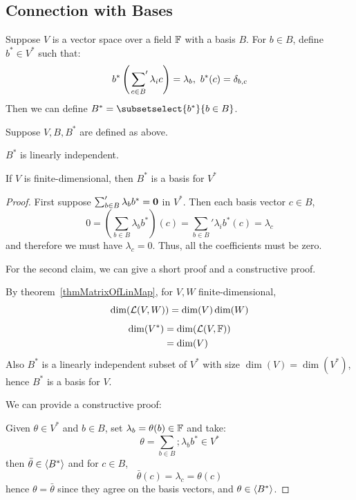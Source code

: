 \documentclass[../Main.tex]{subfiles}
\begin{document}
\subsection{Connection with Bases}
Suppose $V$ is a vector space over a field $\mathbb{F}$ with a basis $B$. For $b \in B$, define $b^* \in V^*$ such that:
\begin{equation*}
    b^* \left(\sideset{}{'}\sum_{c \in B} \lambda_i c\right) = \lambda_b,~b^*(c) = \delta_{b, c}
\end{equation*}
Then we can define $B^* = \subsetselect{b^*}{b \in B}$.
\begin{propositions}{
        Suppose $V, B, B^*$ are defined as above.
        \label{propsDualBasis}
    }
    \item $B^*$ is linearly independent.
    \item If $V$ is finite-dimensional, then $B^*$ is a basis for $V^*$
\end{propositions}
\begin{proof}
    First suppose $\sum_{b \in B}' \lambda_b b^* = \boldsymbol{0}$ in $V^*$. Then each basis vector $c \in B$,
    \begin{equation*}
        0 = \left(\sum_{b \in B} \lambda_b b^*\right)(c) = \sum_{b \in B}' \lambda_i b^*(c) = \lambda_c
    \end{equation*}
    and therefore we must have $\lambda_c = 0$. Thus, all the coefficients must be zero.

    For the second claim, we can give a short proof and a constructive proof.

    By theorem~\ref{thmMatrixOfLinMap}, for $V, W$ finite-dimensional,
    \begin{equation*}
        \dim(\mathcal{L}(V, W)) = \dim(V) \dim(W)
    \end{equation*}
    \begin{align*}
        \dim(V^*) &=\dim(\mathcal{L}(V, \mathbb{F})) \\
        &= \dim(V)
    \end{align*}
    Also $B^*$ is a linearly independent subset of $V^*$ with size $\dim(V) = \dim(V^*)$, hence $B^*$ is a basis for $V$.

    We can provide a constructive proof:
    
    Given $\theta \in V^*$ and $b \in B$, set $\lambda_b = \theta(b) \in \mathbb{F}$ and take:
    \begin{equation*}
        \theta = \sum_{b \in B}; \lambda_b b^* \in V^*
    \end{equation*}
    then $\bar{\theta} \in \left\langle B^* \right\rangle$ and for $c \in B$,
    \begin{equation*}
        \bar{\theta}(c) = \lambda_c = \theta(c)
    \end{equation*}
    hence $\theta = \bar{\theta}$ since they agree on the basis vectors, and $\theta \in \left\langle B^* \right\rangle$.
\end{proof}
\end{document}
